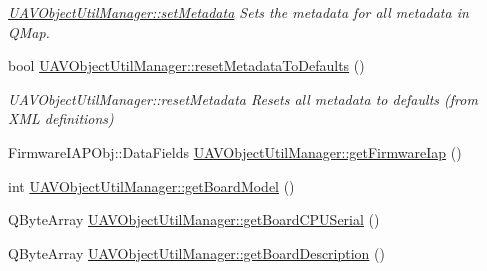 \begin{DoxyCompactItemize}
\begin{DoxyCompactList}\small\item\em \hyperlink{group___u_a_v_object_util_plugin_gab813cc6401727303f0787527bbd29ad1}{\-U\-A\-V\-Object\-Util\-Manager\-::set\-Metadata} \-Sets the metadata for all metadata in \-Q\-Map. \end{DoxyCompactList}\item 
bool \hyperlink{group___u_a_v_object_util_plugin_ga8fadd2e0c6ed3b69a1f8059d2c98054c}{\-U\-A\-V\-Object\-Util\-Manager\-::reset\-Metadata\-To\-Defaults} ()
\begin{DoxyCompactList}\small\item\em \-U\-A\-V\-Object\-Util\-Manager\-::reset\-Metadata \-Resets all metadata to defaults (from \-X\-M\-L definitions) \end{DoxyCompactList}\item 
\-Firmware\-I\-A\-P\-Obj\-::\-Data\-Fields \hyperlink{group___u_a_v_object_util_plugin_gabd93ae6b2c3ecb8444184c8aaf2176bb}{\-U\-A\-V\-Object\-Util\-Manager\-::get\-Firmware\-Iap} ()
\item 
int \hyperlink{group___u_a_v_object_util_plugin_ga45c8f562def61c9273af2b243d981114}{\-U\-A\-V\-Object\-Util\-Manager\-::get\-Board\-Model} ()
\item 
\-Q\-Byte\-Array \hyperlink{group___u_a_v_object_util_plugin_ga11c8171d7e380e699b4edf9b6860a236}{\-U\-A\-V\-Object\-Util\-Manager\-::get\-Board\-C\-P\-U\-Serial} ()
\item 
\-Q\-Byte\-Array \hyperlink{group___u_a_v_object_util_plugin_ga1c07eaa903b38480c6eb46b1a312f66e}{\-U\-A\-V\-Object\-Util\-Manager\-::get\-Board\-Description} ()
\end{DoxyCompactItemize}
